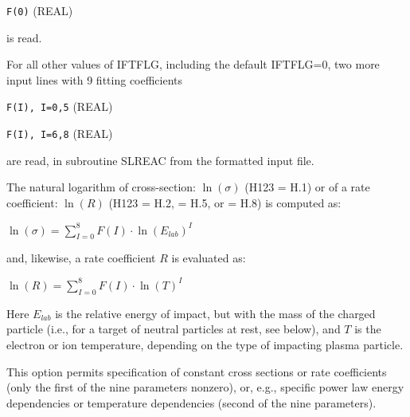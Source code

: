 \begin{description}
\begin{description}
                \lstinline|F(0)| (REAL)

                is read.

                For all other values of IFTFLG, including the default IFTFLG=0, two more input
                lines with 9 fitting coefficients

                \lstinline|F(I), I=0,5| (REAL)

                \lstinline|F(I), I=6,8| (REAL)

                are read, in subroutine SLREAC from the formatted input file.

                The natural logarithm of cross-section: $\ln(\sigma)$ (H123 = H.1) or of a rate
                coefficient: $\ln(R)$ (H123 = H.2, = H.5, or = H.8) is computed as:

                $\ln(\sigma) = \sum_{I=0}^8 F(I) \cdot \ln(E_{lab})^I $

                and, likewise, a rate coefficient $R$ is evaluated as:

                $\ln(R) = \sum_{I=0}^8 F(I) \cdot \ln(T)^I $

                Here $E_{lab}$ is the relative energy of impact, but with the mass of the
                charged particle (i.e., for a target of neutral particles at rest, see below),
                and $T$ is the electron or ion temperature, depending on the type of impacting
                plasma particle.

                This option permits specification of constant cross sections or rate
                coefficients (only the first of the nine parameters nonzero), or, e.g.,
                specific power law energy dependencies or temperature dependencies (second of
                the nine parameters).
        \end{description}


\end{description}
